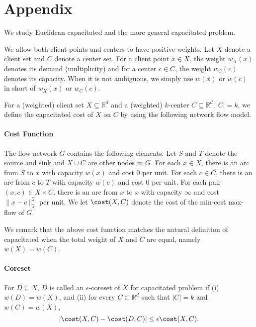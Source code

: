 \section{Appendix}
We study Euclidean capacitated \kMeans and the more general capacitated \kzC problem. 

We allow both client points and centers to have positive weights. Let $X$ denote a client set and $C$ denote a center set. For a client point $x\in X$, the weight $w_X(x)$ denotes its demand (multiplicity) and for a center $c\in C$, the weight $w_C(c)$ denotes its capacity. When it is not ambiguous, we simply use $w(x)$ or $w(c)$ in short of $w_X(x)$ or $w_C(c)$.

For a (weighted) client set $X\subseteq \mathbb{R}^d$ and a (weighted) $k$-center $C\subseteq\mathbb{R}^d,|C|=k$, we define the capacitated \kMeans cost of $X$ on $C$ by using the following network flow model.

\paragraph{Cost Function} The flow network $G$ contains the following elements. Let $S$ and $T$ denote the source and sink and $X\cup C$ are other nodes in $G$. For each $x\in X$, there is an arc from $S$ to $x$ with capacity $w(x)$ and cost $0$ per unit. For each $c\in C$,  there is an arc from $c$ to $T$ with capacity $w(c)$ and cost $0$ per unit. For each pair $(x,c)\in X\times C$, there is an arc from $x$ to $x$ with capacity $\infty$ and cost $\|x-c\|_2^2$ per unit. We let $\cost(X,C)$ denote the cost of the min-cost max-flow of $G$.

We remark that the above cost function matches the natural definition of capacitated \kMeans when the total weight of $X$ and $C$ are equal, namely $w(X)=w(C)$.


\paragraph{Coreset} For $D\subseteq X$, $D$ is called an $\epsilon$-coreset of $X$ for capacitated \kMeans problem if
(i) $w(D)=w(X)$, and
    (ii) for every $C\subset \mathbb{R}^d$ such that $|C|=k$ and $w(C)=w(X)$, $$|\cost(X,C)-\cost(D,C)|\leq \epsilon \cost(X,C).$$


